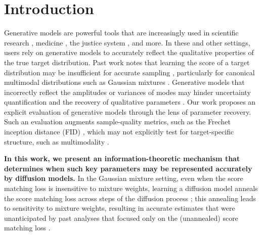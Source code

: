\documentclass[11pt]{article}
\theoremstyle{plain}
\newcommand{\1}{\mathbbm{1}}
\begin{document}
\section{Introduction}
Generative models are powerful tools that are increasingly used in scientific research \citep{lanusse2021deep,price2023gencast,han2025learning}, medicine \citep{loni2025review,fahrner2025generative,teo2025generative}, the justice system \citep{ludwig2024machine,posner2025judge}, and more. In these and other settings, users rely on generative models to accurately reflect the qualitative properties of the true target distribution. Past work notes that learning the score of a target distribution may be insufficient for accurate sampling \citep{koehler2022statisticalefficiencyscorematching, chen2021dimensionfreelogsobolevinequalitiesmixture, li2024softmixturedenoisingexpressive}, particularly for canonical multimodal distributions such as Gaussian mixtures \citep{1100034, yakowitz1968identifiability}. 
Generative models that incorrectly reflect the amplitudes or variances of modes \citep{zhang2025collapse, roos2026met, hakemi2025deeper} may hinder uncertainty quantification and the recovery of qualitative parameters \citep{bouchet2019rare, addison2024cpmgem, mudur2023cosmological}. %
Our work proposes an explicit evaluation of generative models through the lens of parameter recovery. 
Such an evaluation augments sample-quality metrics, such as the Frechet inception distance (FID) \citep{NIPS2017_8a1d6947}, which may not explicitly test for target-specific structure, such as multimodality \citep{sajjadi2018assessing}. %

\textbf{In this work, we present an information-theoretic mechanism that determines when such key parameters may be represented accurately by diffusion models.} In the Gaussian mixture setting, even when the score matching loss is insensitive to mixture weights, learning a diffusion model anneals the score matching loss across steps of the diffusion process \citep{song2019generative}; this annealing leads to sensitivity to mixture weights, resulting in accurate estimates that were unanticipated by past analyses that focused only on the (unannealed) score matching loss \citep{koehler2022statisticalefficiencyscorematching}. 
\end{document}
